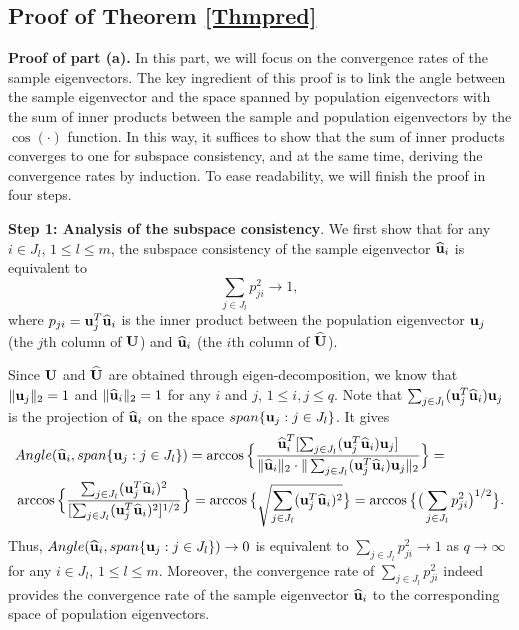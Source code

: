 \documentclass{statsoc}
\newcommand{\bu}{\mbox{\bf u}}
\newcommand{\bU}{\mbox{\bf U}}
\def\t{^T}
\begin{document}
\subsection{Proof of Theorem \ref{Thmpred}}

\smallskip

\textbf{Proof of part (a).} In this part, we will focus on the convergence rates of the sample eigenvectors. The key ingredient of this proof is to link the angle between the sample eigenvector and the space spanned by population eigenvectors with the sum of inner products between the sample and population eigenvectors by the $\cos(\cdot)$ function. In this way, it suffices to show that the sum of inner products converges to one for subspace consistency, and at the same time, deriving the convergence rates by induction. To ease readability, we will finish the proof in four steps.

\medskip

\noindent \textbf{Step 1: Analysis of the subspace consistency}. We first show that for any $i \in J_l$, $1 \leq l \leq m$, the subspace consistency of the sample eigenvector $\widehat{\bu}_i$ is equivalent to
\begin{equation} \label{innerpro}
\sum_{j \in J_l} p_{ji}^2 \to 1,
\end{equation}
where $p_{ji} = \bu_j\t\widehat{\bu}_i$ is the inner product between the population eigenvector $\bu_j$ (the $j$th column of $\bU$) and $\widehat{\bu}_i$ (the $i$th column of $\widehat{\bU}$).

Since $\bU$ and $\widehat{\bU}$ are obtained through eigen-decomposition, we know that $\|\bu_j\|_2 = 1$ and $\|\widehat{\bu}_i\|_2 = 1$ for any $i$ and $j$, $1 \leq i,j \leq q$. Note that $\sum_{j \in J_l} (\bu_j\t\widehat{\bu}_i)\bu_j$ is the projection of $\widehat{\bu}_i$ on the space $span\{\bu_j: j \in J_l\}$. It gives
\begin{align*}
& Angle(\widehat{\bu}_i, span\{\bu_j: j \in J_l\}) = \arccos \Big\{\frac{\widehat{\bu}_i\t[\sum_{j \in J_l} (\bu_j\t\widehat{\bu}_i)\bu_j]}{\|\widehat{\bu}_i\|_2 \cdot \|\sum_{j \in J_l} (\bu_j\t\widehat{\bu}_i)\bu_j\|_2}\Big\} = \\
&\arccos\Big\{\frac{\sum_{j \in J_l} (\bu_j\t\widehat{\bu}_i)^2}{[\sum_{j \in J_l} (\bu_j\t\widehat{\bu}_i)^2]^{1/2}}\Big\} = \arccos \big\{\sqrt{\sum_{j \in J_l} (\bu_j\t\widehat{\bu}_i)^2}\big\} = \arccos\big\{\big(\sum_{j \in J_l} p_{ji}^2\big)^{1/2}\big\}.
\end{align*}
Thus, $Angle(\widehat{\bu}_i, span\{\bu_j: j \in J_l\}) \to 0$ is equivalent to $\sum_{j \in J_l} p_{ji}^2 \to 1$ as $q \to \infty$ for any $i \in J_l$, $1 \leq l \leq m$. Moreover, the convergence rate of $\sum_{j \in J_l} p_{ji}^2$ indeed provides the convergence rate of the sample eigenvector $\widehat{\bu}_i$ to the corresponding space of population eigenvectors.
\end{document}
